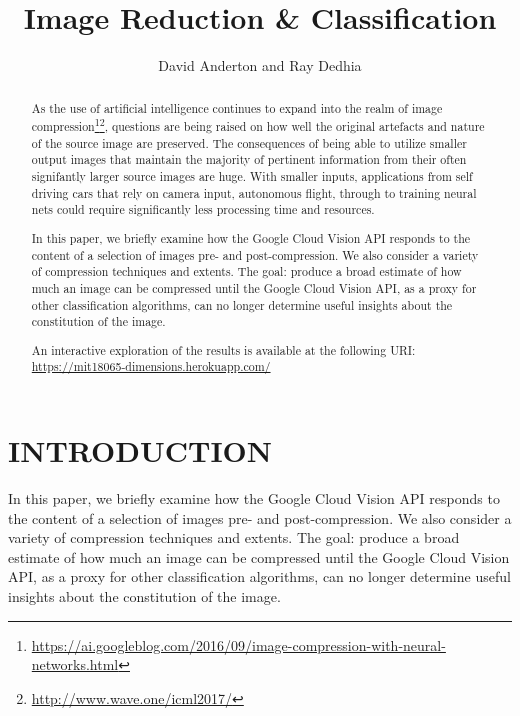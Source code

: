 \documentclass[letterpaper, 10 pt, conference]{ieeeconf}  %
\title{\LARGE \bf Image Reduction \& Classification}
\author{David Anderton and Ray Dedhia}
\begin{document}
\maketitle
\thispagestyle{empty}
\pagestyle{empty}



\begin{abstract}

\normalsize %

As the use of artificial intelligence continues to expand into the realm of image compression\footnote{\url{https://ai.googleblog.com/2016/09/image-compression-with-neural-networks.html}}\footnote{\url{http://www.wave.one/icml2017/}}, questions are being raised on how well the original artefacts and nature of the source image are preserved. The consequences of being able to utilize smaller output images that maintain the majority of pertinent information from their often signifantly larger source images are huge. With smaller inputs, applications from self driving cars that rely on camera input, autonomous flight, through to training neural nets could require significantly less processing time and resources.

In this paper, we briefly examine how the Google Cloud Vision API responds to the content of a selection of images pre- and post-compression. We also consider a variety of compression techniques and extents. The goal: produce a broad estimate of how much an image can be compressed until the Google Cloud Vision API, as a proxy for other classification algorithms, can no longer determine useful insights about the constitution of the image.

An interactive exploration of the results is available at the following URI: \url{https://mit18065-dimensions.herokuapp.com/}

\end{abstract}

\section{INTRODUCTION}

In this paper, we briefly examine how the Google Cloud Vision API responds to the content of a selection of images pre- and post-compression. We also consider a variety of compression techniques and extents. The goal: produce a broad estimate of how much an image can be compressed until the Google Cloud Vision API, as a proxy for other classification algorithms, can no longer determine useful insights about the constitution of the image.
\end{document}
